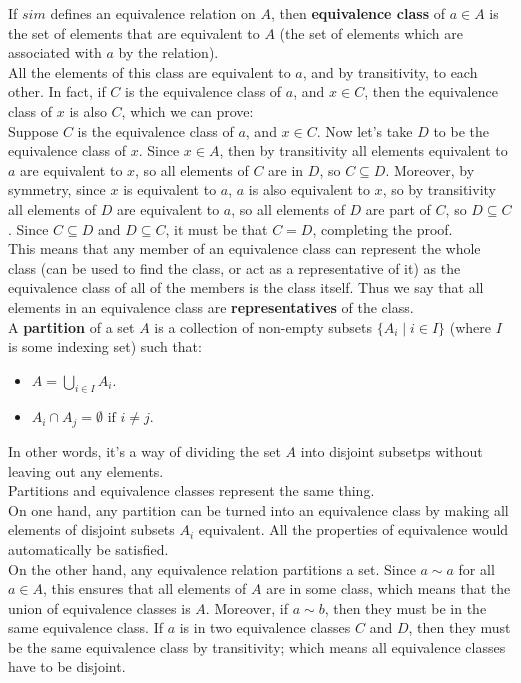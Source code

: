 \documentclass[12pt]{article}
\begin{document}
    If $sim$ defines an equivalence relation on $A$,
    then \textbf{equivalence class} of $a \in A$
    is the set of elements that are equivalent to $A$
    (the set of elements which are associated with $a$ by the relation). \\
    All the elements of this class are equivalent to $a$,
    and by transitivity, to each other.
    In fact, if $C$ is the equivalence class of $a$,
    and $x \in C$, then the equivalence class of $x$ is also $C$,
    which we can prove: \\
    Suppose $C$ is the equivalence class of $a$,
    and $x \in C$.
    Now let's take $D$ to be the equivalence class of $x$.
    Since $x \in A$,
    then by transitivity all elements equivalent to $a$
    are equivalent to $x$,
    so all elements of $C$ are in $D$,
    so $C \subseteq D$.
    Moreover, by symmetry, since $x$ is equivalent to $a$,
    $a$ is also equivalent to $x$,
    so by transitivity all elements of $D$ are equivalent to $a$,
    so all elements of $D$ are part of $C$,
    so $D \subseteq C$.
    Since $C \subseteq D$ and $D \subseteq C$,
    it must be that $C = D$,
    completing the proof. \\
    This means that any member of an equivalence class
    can represent the whole class
    (can be used to find the class, or act as a representative of it)
    as the equivalence class of all of the members is the class itself.
    Thus we say that all elements in an equivalence class
    are \textbf{representatives} of the class. \\

    A \textbf{partition} of a set $A$ is a collection
    of non-empty subsets $\{ A_i \mid i \in I \}$
    (where $I$ is some indexing set) such that:
    \begin{itemize}[label=$\diamond$]
        \item 
            $A = \bigcup_{i \in I} A_i$.
        \item 
            $A_i \cap A_j = \emptyset \text{ if } i \neq j$.
    \end{itemize}
    In other words,
    it's a way of dividing the set $A$ into disjoint subsetps
    without leaving out any elements. \\

    Partitions and equivalence classes represent the same thing. \\
    On one hand, any partition can be turned into 
    an equivalence class by making all elements of disjoint subsets $A_i$
    equivalent.
    All the properties of equivalence
    would automatically be satisfied. \\
    On the other hand,
    any equivalence relation partitions a set.
    Since $a \sim a$ for all $a \in A$,
    this ensures that all elements of $A$ are in some class,
    which means that the union of equivalence classes is $A$.
    Moreover, if $a \sim b$,
    then they must be in the same equivalence class.
    If $a$ is in two equivalence classes $C$ and $D$,
    then they must be the same equivalence class
    by transitivity;
    which means all equivalence classes have to be disjoint. \\
\end{document}
